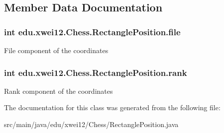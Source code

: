 \subsection{Member Data Documentation}
\subsubsection[{\texorpdfstring{file}{file}}]{\setlength{\rightskip}{0pt plus 5cm}int edu.\+xwei12.\+Chess.\+Rectangle\+Position.\+file}\hypertarget{classedu_1_1xwei12_1_1_chess_1_1_rectangle_position_a39dcb7c30baa4025e919421f27dedfa1}{}\label{classedu_1_1xwei12_1_1_chess_1_1_rectangle_position_a39dcb7c30baa4025e919421f27dedfa1}
File component of the coordinates 
\subsubsection[{\texorpdfstring{rank}{rank}}]{\setlength{\rightskip}{0pt plus 5cm}int edu.\+xwei12.\+Chess.\+Rectangle\+Position.\+rank}\hypertarget{classedu_1_1xwei12_1_1_chess_1_1_rectangle_position_ac27be8af6f6e1398f1d3c73dc8c34363}{}\label{classedu_1_1xwei12_1_1_chess_1_1_rectangle_position_ac27be8af6f6e1398f1d3c73dc8c34363}
Rank component of the coordinates 

The documentation for this class was generated from the following file\+:\begin{DoxyCompactItemize}
\item 
src/main/java/edu/xwei12/\+Chess/Rectangle\+Position.\+java\end{DoxyCompactItemize}
